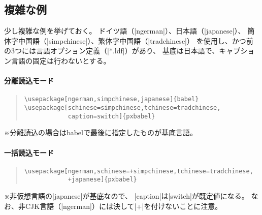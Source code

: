 \documentclass[uplatex,dvipdfmx,a4paper]{jsarticle}
\newcommand{\Pkg}[1]{\textsf{#1}}
\newcommand{\Note}{\par\noindent ※}
\newcommand{\XS}{\hspace{\xkanjiskip}}
\begin{document}
\subsection{複雑な例}
\label{ssec:complex-loading}

少し複雑な例を挙げておく。
ドイツ語（|ngerman|）、日本語（|japanese|）、
簡体字中国語（|simpchinese|）、繁体字中国語（|tradchinese|）
を使用し、かつ前の3つには言語オプション定義（|*.ldf|）があり、
基底は日本語で、キャプション言語の固定は行わないとする。

\paragraph{分離読込モード}

\begin{quote}\begin{verbatim}
\usepackage[ngerman,simpchinese,japanese]{babel}
\usepackage[schinese=simpchinese,tchinese=tradchinese,
            caption=switch]{pxbabel}
\end{verbatim}\end{quote}

\Note 分離読込の場合は\Pkg{babel}で最後に指定したものが基底言語。

\paragraph{一括読込モード}
\begin{quote}\begin{verbatim}
\usepackage[ngerman,schinese=+simpchinese,tchinese=tradchinese,
            +japanese]{pxbabel}
\end{verbatim}\end{quote}

\Note 非仮想言語の|japanese|が基底なので、
|caption|は|switch|が既定値になる。
なお、非CJK言語（|ngerman|）には決して\XS|+|\XS を付けないことに注意。

\end{document}
